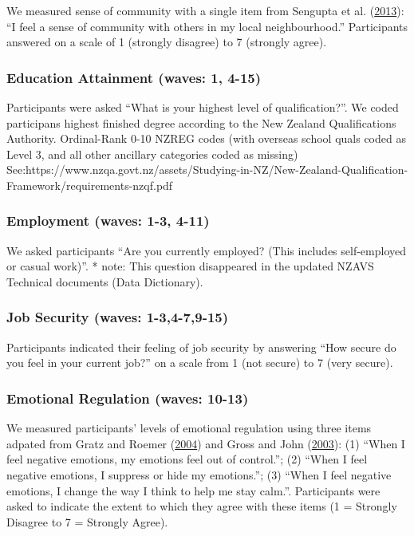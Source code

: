 \documentclass[
  singlecolumn]{report}
\begin{document}
We measured sense of community with a single item from Sengupta et al.
(\protect\hyperlink{ref-sengupta2013}{2013}): ``I feel a sense of
community with others in my local neighbourhood.'' Participants answered
on a scale of 1 (strongly disagree) to 7 (strongly agree).

\hypertarget{education-attainment-waves-1-4-15}{%
\subsubsection{Education Attainment (waves: 1,
4-15)}\label{education-attainment-waves-1-4-15}}

Participants were asked ``What is your highest level of
qualification?''. We coded participans highest finished degree according
to the New Zealand Qualifications Authority. Ordinal-Rank 0-10 NZREG
codes (with overseas school quals coded as Level 3, and all other
ancillary categories coded as missing)
See:https://www.nzqa.govt.nz/assets/Studying-in-NZ/New-Zealand-Qualification-Framework/requirements-nzqf.pdf

\hypertarget{employment-waves-1-3-4-11}{%
\subsubsection{Employment (waves: 1-3,
4-11)}\label{employment-waves-1-3-4-11}}

We asked participants ``Are you currently employed? (This includes
self-employed or casual work)''. * note: This question disappeared in
the updated NZAVS Technical documents (Data Dictionary).

\hypertarget{job-security-waves-1-34-79-15}{%
\subsubsection{Job Security (waves:
1-3,4-7,9-15)}\label{job-security-waves-1-34-79-15}}

Participants indicated their feeling of job security by answering ``How
secure do you feel in your current job?'' on a scale from 1 (not secure)
to 7 (very secure).

\hypertarget{emotional-regulation-waves-10-13}{%
\subsubsection{Emotional Regulation (waves:
10-13)}\label{emotional-regulation-waves-10-13}}

We measured participants' levels of emotional regulation using three
items adpated from Gratz and Roemer
(\protect\hyperlink{ref-gratz_multidimensional_2004}{2004}) and Gross
and John (\protect\hyperlink{ref-gross_individual_2003}{2003}): (1)
``When I feel negative emotions, my emotions feel out of control.''; (2)
``When I feel negative emotions, I suppress or hide my emotions.''; (3)
``When I feel negative emotions, I change the way I think to help me
stay calm.''. Participants were asked to indicate the extent to which
they agree with these items (1 = Strongly Disagree to 7 = Strongly
Agree).
\end{document}
